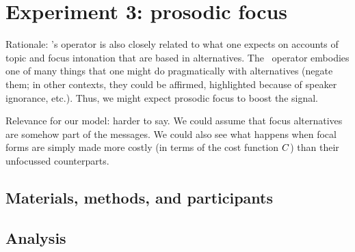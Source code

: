 \documentclass{article}
\begin{document}

\section{Experiment 3: prosodic focus}\label{sec:exp3}

\begin{examples}
\item Rationale: \CFS's operator is also closely related to what one
  expects on accounts of topic and focus intonation that are based in
  alternatives. The \ALT\ operator embodies one of many things that
  one might do pragmatically with alternatives (negate them; in other
  contexts, they could be affirmed, highlighted because of speaker
  ignorance, etc.). Thus, we might expect prosodic focus to boost the
  signal.

\item Relevance for our model: harder to say. We could assume that
  focus alternatives are somehow part of the messages. We could also
  see what happens when focal forms are simply made more costly (in
  terms of the cost function $C$) than their unfocussed
  counterparts.
\end{examples}


\subsection{Materials, methods, and participants}


\subsection{Analysis}




\end{document}
